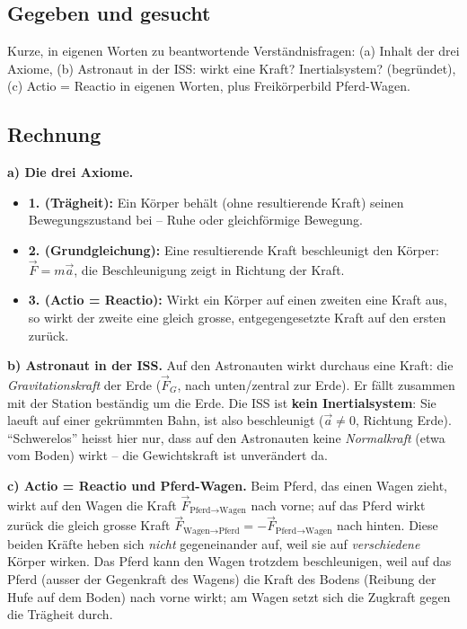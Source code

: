
\subsection*{Gegeben und gesucht}
Kurze, in eigenen Worten zu beantwortende Verständnisfragen: (a) Inhalt
der drei Axiome, (b) Astronaut in der ISS: wirkt eine Kraft? Inertialsystem?
(begründet), (c) Actio = Reactio in eigenen Worten, plus
Freikörperbild Pferd-Wagen.

\subsection*{Rechnung}
\textbf{a) Die drei Axiome.}
\begin{itemize}
  \item \textbf{1. (Trägheit):} Ein Körper behält (ohne resultierende
        Kraft) seinen Bewegungszustand bei -- Ruhe oder gleichförmige
        Bewegung.
  \item \textbf{2. (Grundgleichung):} Eine resultierende Kraft
        beschleunigt den Körper: $\vec F=m\vec a$, die Beschleunigung
        zeigt in Richtung der Kraft.
  \item \textbf{3. (Actio = Reactio):} Wirkt ein Körper auf einen zweiten
        eine Kraft aus, so wirkt der zweite eine gleich grosse,
        entgegengesetzte Kraft auf den ersten zurück.
\end{itemize}

\textbf{b) Astronaut in der ISS.} Auf den Astronauten wirkt durchaus eine
Kraft: die \emph{Gravitationskraft} der Erde ($\vec F_G$, nach unten/zentral
zur Erde). Er fällt zusammen mit der Station beständig um die Erde. Die
ISS ist \textbf{kein Inertialsystem}: Sie laeuft auf einer gekrümmten
Bahn, ist also beschleunigt ($\vec a\ne0$, Richtung Erde). ``Schwerelos''
heisst hier nur, dass auf den Astronauten keine \emph{Normalkraft} (etwa
vom Boden) wirkt -- die Gewichtskraft ist unverändert da.

\textbf{c) Actio = Reactio und Pferd-Wagen.} Beim Pferd, das einen Wagen
zieht, wirkt auf den Wagen die Kraft $\vec F_{\text{Pferd}\to\text{Wagen}}$
nach vorne; auf das Pferd wirkt zurück die gleich grosse Kraft
$\vec F_{\text{Wagen}\to\text{Pferd}}=-\vec F_{\text{Pferd}\to\text{Wagen}}$
nach hinten. Diese beiden Kräfte heben sich \emph{nicht} gegeneinander auf,
weil sie auf \emph{verschiedene} Körper wirken. Das Pferd kann den Wagen
trotzdem beschleunigen, weil auf das Pferd (ausser der Gegenkraft des
Wagens) die Kraft des Bodens (Reibung der Hufe auf dem Boden) nach vorne
wirkt; am Wagen setzt sich die Zugkraft gegen die Trägheit durch.

